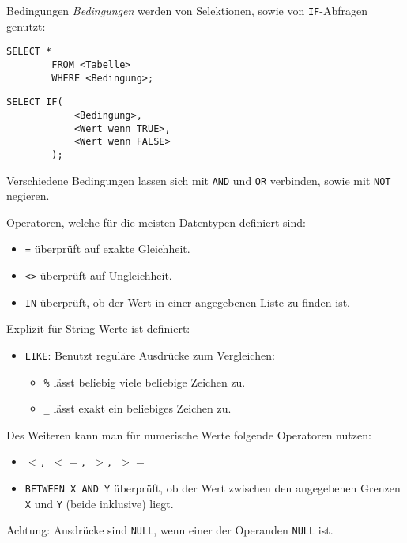 \begin{sql}{Bedingungen}
    \emph{Bedingungen} werden von Selektionen, sowie von \texttt{IF}-Abfragen genutzt:

    \begin{lstlisting}[language=mysql]
        SELECT *
        FROM <Tabelle>
        WHERE <Bedingung>;
    \end{lstlisting}

    \begin{lstlisting}[language=mysql]
        SELECT IF(
            <Bedingung>,
            <Wert wenn TRUE>,
            <Wert wenn FALSE>
        );
    \end{lstlisting}

    Verschiedene Bedingungen lassen sich mit \texttt{AND} und \texttt{OR} verbinden, sowie mit \texttt{NOT} negieren.

    Operatoren, welche für die meisten Datentypen definiert sind:

    \begin{itemize}
        \item \texttt{=} überprüft auf exakte Gleichheit.
        \item \texttt{<>} überprüft auf Ungleichheit.
        \item \texttt{IN} überprüft, ob der Wert in einer angegebenen Liste zu finden ist.
    \end{itemize}

    Explizit für String Werte ist definiert:

    \begin{itemize}
        \item \texttt{LIKE}: Benutzt reguläre Ausdrücke zum Vergleichen:
            \begin{itemize}
                \item \texttt{\%} lässt beliebig viele beliebige Zeichen zu.
                \item \texttt{\_} lässt exakt ein beliebiges Zeichen zu.
            \end{itemize}
    \end{itemize}

    Des Weiteren kann man für numerische Werte folgende Operatoren nutzen:

    \begin{itemize}
        \item \texttt{$<$, $<=$, $>$, $>=$}
        \item \texttt{BETWEEN X AND Y} überprüft, ob der Wert zwischen den angegebenen Grenzen \texttt{X} und \texttt{Y} (beide inklusive) liegt.
    \end{itemize}

    Achtung: Ausdrücke sind \texttt{NULL}, wenn einer der Operanden \texttt{NULL} ist.
\end{sql}

